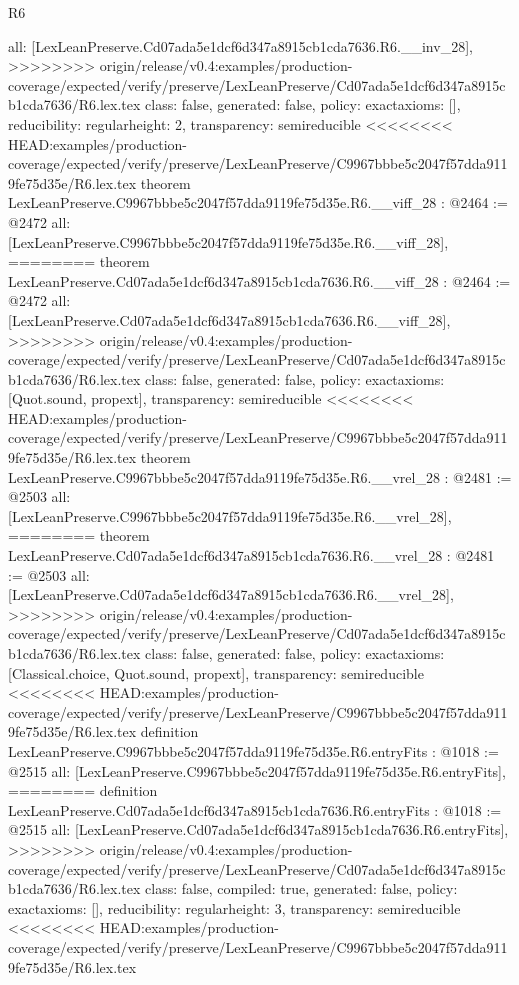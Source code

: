 \begin{lexlean}{R6}
\begin{coremodule}
{{{{{{{{{{{{  all: [LexLeanPreserve.Cd07ada5e1dcf6d347a8915cb1cda7636.R6.__inv_28],
>>>>>>>> origin/release/v0.4:examples/production-coverage/expected/verify/preserve/LexLeanPreserve/Cd07ada5e1dcf6d347a8915cb1cda7636/R6.lex.tex
  class: false,
  generated: false,
  policy: exact{axioms: []},
  reducibility: regular{height: 2},
  transparency: semireducible
}
<<<<<<<< HEAD:examples/production-coverage/expected/verify/preserve/LexLeanPreserve/C9967bbbe5c2047f57dda9119fe75d35e/R6.lex.tex
theorem LexLeanPreserve.C9967bbbe5c2047f57dda9119fe75d35e.R6.__viff_28 : @2464 := @2472 {
  all: [LexLeanPreserve.C9967bbbe5c2047f57dda9119fe75d35e.R6.__viff_28],
========
theorem LexLeanPreserve.Cd07ada5e1dcf6d347a8915cb1cda7636.R6.__viff_28 : @2464 := @2472 {
  all: [LexLeanPreserve.Cd07ada5e1dcf6d347a8915cb1cda7636.R6.__viff_28],
>>>>>>>> origin/release/v0.4:examples/production-coverage/expected/verify/preserve/LexLeanPreserve/Cd07ada5e1dcf6d347a8915cb1cda7636/R6.lex.tex
  class: false,
  generated: false,
  policy: exact{axioms: [Quot.sound, propext]},
  transparency: semireducible
}
<<<<<<<< HEAD:examples/production-coverage/expected/verify/preserve/LexLeanPreserve/C9967bbbe5c2047f57dda9119fe75d35e/R6.lex.tex
theorem LexLeanPreserve.C9967bbbe5c2047f57dda9119fe75d35e.R6.__vrel_28 : @2481 := @2503 {
  all: [LexLeanPreserve.C9967bbbe5c2047f57dda9119fe75d35e.R6.__vrel_28],
========
theorem LexLeanPreserve.Cd07ada5e1dcf6d347a8915cb1cda7636.R6.__vrel_28 : @2481 := @2503 {
  all: [LexLeanPreserve.Cd07ada5e1dcf6d347a8915cb1cda7636.R6.__vrel_28],
>>>>>>>> origin/release/v0.4:examples/production-coverage/expected/verify/preserve/LexLeanPreserve/Cd07ada5e1dcf6d347a8915cb1cda7636/R6.lex.tex
  class: false,
  generated: false,
  policy: exact{axioms: [Classical.choice, Quot.sound, propext]},
  transparency: semireducible
}
<<<<<<<< HEAD:examples/production-coverage/expected/verify/preserve/LexLeanPreserve/C9967bbbe5c2047f57dda9119fe75d35e/R6.lex.tex
definition LexLeanPreserve.C9967bbbe5c2047f57dda9119fe75d35e.R6.entryFits : @1018 := @2515 {
  all: [LexLeanPreserve.C9967bbbe5c2047f57dda9119fe75d35e.R6.entryFits],
========
definition LexLeanPreserve.Cd07ada5e1dcf6d347a8915cb1cda7636.R6.entryFits : @1018 := @2515 {
  all: [LexLeanPreserve.Cd07ada5e1dcf6d347a8915cb1cda7636.R6.entryFits],
>>>>>>>> origin/release/v0.4:examples/production-coverage/expected/verify/preserve/LexLeanPreserve/Cd07ada5e1dcf6d347a8915cb1cda7636/R6.lex.tex
  class: false,
  compiled: true,
  generated: false,
  policy: exact{axioms: []},
  reducibility: regular{height: 3},
  transparency: semireducible
}
<<<<<<<< HEAD:examples/production-coverage/expected/verify/preserve/LexLeanPreserve/C9967bbbe5c2047f57dda9119fe75d35e/R6.lex.tex
}}}}}}}}}}}}}}
\end{coremodule}
\end{lexlean}
